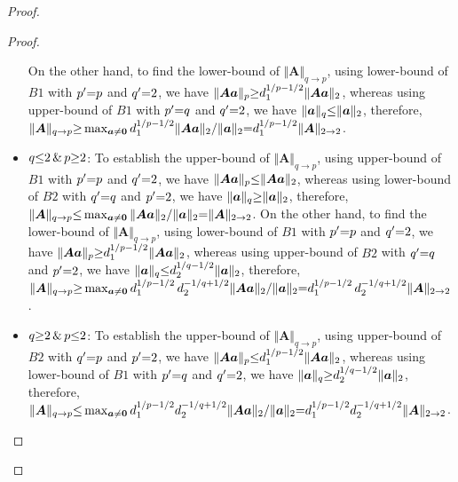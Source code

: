 \begin{proof}
\begin{proof}
\begin{itemize}
On the other hand, to find the lower-bound of $\Vert \boldsymbol{A}\Vert_{q \to p}$, using lower-bound of $B1$ with $p' {=} p$ and $q' {=} 2$, we have $\Vert \boldsymbol{Aa}\Vert_p {\geq} d_1^{1/p {-} 1/2} \Vert \boldsymbol{Aa}\Vert_2$, whereas using upper-bound of $B1$ with $p' {=} q$ and $q' {=} 2$, we have $\Vert \boldsymbol{a}\Vert_q {\leq} \Vert \boldsymbol{a}\Vert_2$, therefore, $\Vert \boldsymbol{A}\Vert_{q \to p} {\geq} \max_{\boldsymbol{a} \neq \boldsymbol{0}} d_1^{1/p {-} 1/2} \Vert \boldsymbol{Aa}\Vert_2 {/} \Vert \boldsymbol{a}\Vert_2 {=} d_1^{1/p {-} 1/2} \Vert \boldsymbol{A}\Vert_{2 \to 2}$.
\item ${q {\leq} 2\, \& \, p {\geq} 2}$: To establish the upper-bound of $\Vert \boldsymbol{A}\Vert_{q \to p}$, using upper-bound of $B1$ with $p' {=} p$ and $q' {=} 2$, we have $\Vert \boldsymbol{Aa}\Vert_p {\leq} \Vert \boldsymbol{Aa}\Vert_2$, whereas using lower-bound of $B2$ with $q' {=} q$ and $p' {=} 2$, we have $\Vert \boldsymbol{a}\Vert_q {\geq} \Vert \boldsymbol{a}\Vert_2$, therefore, $\Vert \boldsymbol{A}\Vert_{q \to p} {\leq} \max_{\boldsymbol{a} \neq \boldsymbol{0}} \Vert \boldsymbol{Aa}\Vert_2 {/} \Vert \boldsymbol{a}\Vert_2 {=} \Vert \boldsymbol{A}\Vert_{2 \to 2}$.
On the other hand, to find the lower-bound of $\Vert \boldsymbol{A}\Vert_{q \to p}$, using lower-bound of $B1$ with $p' {=} p$ and $q' {=} 2$, we have $\Vert \boldsymbol{Aa}\Vert_p {\geq} d_1^{1/p {-} 1/2} \Vert \boldsymbol{Aa}\Vert_2$, whereas using upper-bound of $B2$ with $q' {=} q$ and $p' {=} 2$, we have $\Vert \boldsymbol{a}\Vert_q {\leq} d_2^{1/q {-} 1/2} \Vert \boldsymbol{a}\Vert_2$, therefore, $\Vert \boldsymbol{A}\Vert_{q \to p} {\geq} \max_{\boldsymbol{a} \neq \boldsymbol{0}} d_1^{1/p {-} 1/2} \, d_2^{-1/q {+} 1/2} \Vert \boldsymbol{Aa}\Vert_2 {/} \Vert \boldsymbol{a}\Vert_2 {=} d_1^{1/p {-} 1/2} \, d_2^{-1/q {+} 1/2} \Vert \boldsymbol{A}\Vert_{2 \to 2}$.
\item ${q {\geq} 2\, \& \, p {\leq} 2}$: To establish the upper-bound of $\Vert \boldsymbol{A}\Vert_{q \to p}$, using upper-bound of $B2$ with $q' {=} p$ and $p' {=} 2$, we have $\Vert \boldsymbol{Aa}\Vert_p {\leq} d_1^{1/p {-} 1/2} \Vert \boldsymbol{Aa}\Vert_2$, whereas using lower-bound of $B1$ with $p' {=} q$ and $q' {=} 2$, we have $\Vert \boldsymbol{a}\Vert_q {\geq} d_2^{1/q {-} 1/2} \Vert \boldsymbol{a}\Vert_2$, therefore, $\Vert \boldsymbol{A}\Vert_{q \to p} {\leq} \max_{\boldsymbol{a} \neq \boldsymbol{0}} d_1^{1/p {-} 1/2} d_2^{-1/q {+} 1/2} \Vert \boldsymbol{Aa}\Vert_2 {/} \Vert \boldsymbol{a}\Vert_2 {=} d_1^{1/p {-} 1/2} d_2^{-1/q {+} 1/2} \Vert \boldsymbol{A}\Vert_{2 \to 2}$.

\end{itemize}
\end{proof}
\end{proof}
